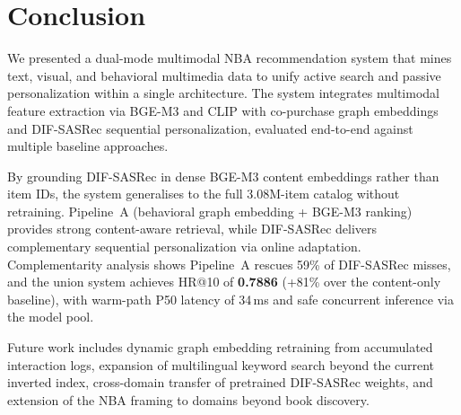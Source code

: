 \section{Conclusion}
\label{sec:conclusion}

We presented a dual-mode multimodal NBA recommendation system that mines
text, visual, and behavioral multimedia data to unify active search and
passive personalization within a single architecture.
The system integrates multimodal feature extraction via BGE-M3 and CLIP
with co-purchase graph embeddings and DIF-SASRec sequential personalization,
evaluated end-to-end against multiple baseline approaches.

By grounding DIF-SASRec in dense BGE-M3 content embeddings rather than
item IDs, the system generalises to the full 3.08M-item catalog without
retraining.
Pipeline~A (behavioral graph embedding + BGE-M3 ranking) provides strong
content-aware retrieval, while DIF-SASRec delivers complementary
sequential personalization via online adaptation.
Complementarity analysis shows Pipeline~A rescues 59\% of DIF-SASRec
misses, and the union system achieves HR@10 of \textbf{0.7886}
(+81\% over the content-only baseline), with warm-path P50 latency of
34\,ms and safe concurrent inference via the model pool.

Future work includes dynamic graph embedding retraining from accumulated
interaction logs, expansion of multilingual keyword search beyond
the current inverted index, cross-domain transfer of pretrained
DIF-SASRec weights, and extension of the NBA framing to domains
beyond book discovery.

